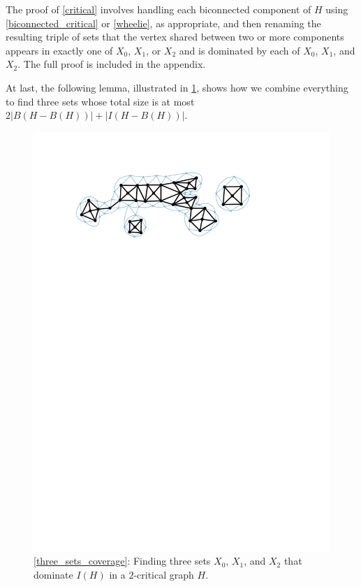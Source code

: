 \documentclass[a4paper,UKenglish,cleveref, autoref, thm-restate]{lipics-v2021}
\begin{document}
The proof of \cref{critical} involves handling each biconnected component of $H$ using \cref{biconnected_critical} or \cref{wheelie}, as appropriate, and then renaming the resulting triple of sets that the vertex shared between two or more components appears in exactly one of $X_0$, $X_1$, or $X_2$ and is dominated by each of $X_0$, $X_1$, and $X_2$.  The full proof is included in the appendix.

At last, the following lemma, illustrated in \cref{two_critical_colouring}, shows how we combine everything to find three sets whose total size is at most $2|B(H-B(H))| + |I(H-B(H))|$.

\begin{figure}
  \centering
  \includegraphics[page=4]{figs/two_critical}
  \caption{\cref{three_sets_coverage}: Finding three sets $X_0$, $X_1$, and $X_2$ that dominate $I(H)$ in a $2$-critical graph $H$.}
  \label{two_critical_colouring}
\end{figure}
\end{document}
